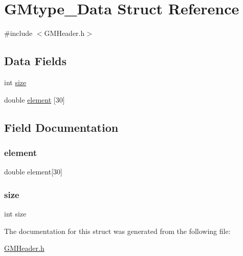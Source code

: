 \hypertarget{struct_g_mtype___data}{}\section{G\+Mtype\+\_\+\+Data Struct Reference}
\label{struct_g_mtype___data}


{\ttfamily \#include $<$G\+M\+Header.\+h$>$}

\subsection*{Data Fields}
\begin{DoxyCompactItemize}
\item 
int \mbox{\hyperlink{struct_g_mtype___data_a439227feff9d7f55384e8780cfc2eb82}{size}}
\item 
double \mbox{\hyperlink{struct_g_mtype___data_abccce14669ca0e42eeedbdc77f604ca9}{element}} \mbox{[}30\mbox{]}
\end{DoxyCompactItemize}


\subsection{Field Documentation}
\mbox{\label{struct_g_mtype___data_abccce14669ca0e42eeedbdc77f604ca9}} 
\subsubsection{\texorpdfstring{element}{element}}
{\footnotesize\ttfamily double element\mbox{[}30\mbox{]}}

\mbox{\label{struct_g_mtype___data_a439227feff9d7f55384e8780cfc2eb82}} 
\subsubsection{\texorpdfstring{size}{size}}
{\footnotesize\ttfamily int size}



The documentation for this struct was generated from the following file\+:\begin{DoxyCompactItemize}
\item 
\mbox{\hyperlink{_g_m_header_8h}{G\+M\+Header.\+h}}\end{DoxyCompactItemize}
